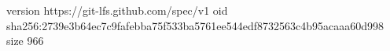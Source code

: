 version https://git-lfs.github.com/spec/v1
oid sha256:2739e3b64ec7c9fafebba75f533ba5761ee544edf8732563c4b95acaaa60d998
size 966
